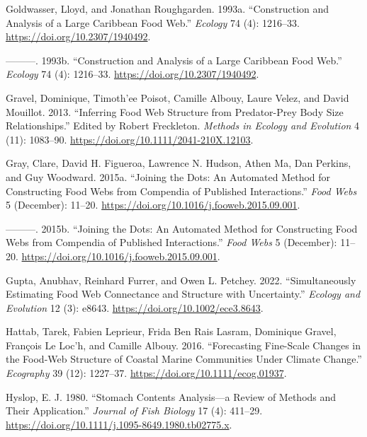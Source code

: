\documentclass{article}
\newlength{\cslhangindent}
\newlength{\cslentryspacingunit} %
\newenvironment{CSLReferences}[2] %
 {%
  \setlength{\parindent}{0pt}
  \ifodd #1
  \let\oldpar\par
  \def\par{\hangindent=\cslhangindent\oldpar}
  \fi
  \setlength{\parskip}{#2\cslentryspacingunit}
 }%
 {}
\begin{document}
\begin{CSLReferences}{1}{0}
\leavevmode{}%
Goldwasser, Lloyd, and Jonathan Roughgarden. 1993a. {``Construction and
{Analysis} of a {Large Caribbean Food Web}.''} \emph{Ecology} 74 (4):
1216--33. \url{https://doi.org/10.2307/1940492}.

\leavevmode{}%
---------. 1993b. {``Construction and Analysis of a Large Caribbean Food
Web.''} \emph{Ecology} 74 (4): 1216--33.
\url{https://doi.org/10.2307/1940492}.

\leavevmode{}%
Gravel, Dominique, Timoth'ee Poisot, Camille Albouy, Laure Velez, and
David Mouillot. 2013. {``Inferring Food Web Structure from Predator-Prey
Body Size Relationships.''} Edited by Robert Freckleton. \emph{Methods
in Ecology and Evolution} 4 (11): 1083--90.
\url{https://doi.org/10.1111/2041-210X.12103}.

\leavevmode{}%
Gray, Clare, David H. Figueroa, Lawrence N. Hudson, Athen Ma, Dan
Perkins, and Guy Woodward. 2015a. {``Joining the Dots: {An} Automated
Method for Constructing Food Webs from Compendia of Published
Interactions.''} \emph{Food Webs} 5 (December): 11--20.
\url{https://doi.org/10.1016/j.fooweb.2015.09.001}.

\leavevmode{}%
---------. 2015b. {``Joining the Dots: {An} Automated Method for
Constructing Food Webs from Compendia of Published Interactions.''}
\emph{Food Webs} 5 (December): 11--20.
\url{https://doi.org/10.1016/j.fooweb.2015.09.001}.

\leavevmode{}%
Gupta, Anubhav, Reinhard Furrer, and Owen L. Petchey. 2022.
{``Simultaneously Estimating Food Web Connectance and Structure with
Uncertainty.''} \emph{Ecology and Evolution} 12 (3): e8643.
\url{https://doi.org/10.1002/ece3.8643}.

\leavevmode{}%
Hattab, Tarek, Fabien Leprieur, Frida Ben Rais Lasram, Dominique Gravel,
François Le Loc'h, and Camille Albouy. 2016. {``Forecasting Fine-Scale
Changes in the Food-Web Structure of Coastal Marine Communities Under
Climate Change.''} \emph{Ecography} 39 (12): 1227--37.
\url{https://doi.org/10.1111/ecog.01937}.

\leavevmode{}%
Hyslop, E. J. 1980. {``Stomach Contents Analysis---a Review of Methods
and Their Application.''} \emph{Journal of Fish Biology} 17 (4):
411--29. \url{https://doi.org/10.1111/j.1095-8649.1980.tb02775.x}.


\end{CSLReferences}
\end{document}
